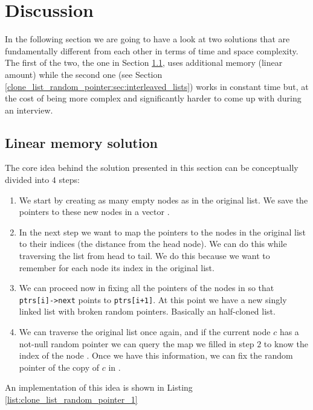 \section{Discussion}
\label{clone_list_random_pointer:sec:discussion}

In the following section we are going to have a look at two solutions that are fundamentally different from each other in terms of time and space complexity.
The first of the two, the one in Section \ref{clone_list_random_pointer:sec:bruteforce}, uses additional memory (linear amount) while the second one (see Section \ref{clone_list_random_pointer:sec:interleaved_lists}) works in constant time but, at the cost of being more complex and significantly harder to come up with during an interview.

\subsection{Linear memory solution}
\label{clone_list_random_pointer:sec:bruteforce}
The core idea behind the solution presented in this section can be conceptually divided into $4$ steps:
\begin{enumerate}
	\item We start by creating as many empty nodes as in the original list. We save the pointers to these new nodes in a vector .
	\item In the next step we want to map the pointers to the nodes in the original list to their indices (the distance from the head node). 
	We can do this while traversing the list from head to tail. 
	We do this because we want to remember for each node its index  in the original list. 
	\item We can proceed now in fixing all the  pointers of the nodes in  so that \lstinline[columns=fixed]{ptrs[i]->next} points to  \lstinline[columns=fixed]{ptrs[i+1]}. At this point we have a new singly linked list with broken random pointers. Basically an half-cloned list.
	\item We can traverse the original list once again, and if the current node $c$ has a not-null random pointer  we can query the map we filled in step $2$ to know the index of the node . Once we have this information, we can fix the random pointer of the copy of $c$ in .
\end{enumerate}
An implementation of this idea is shown in  Listing \ref{list:clone_list_random_pointer_1}


